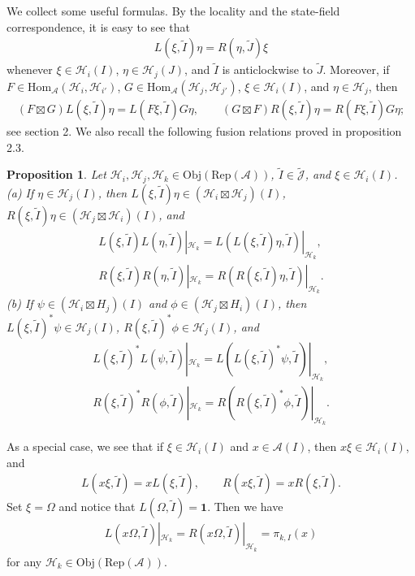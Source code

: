 \documentclass[11pt,b5paper,notitlepage]{article}
\theoremstyle{definition}
\theoremstyle{plain}
\newtheorem{pp}[df]{Proposition}
\newcommand{\mc}{\mathcal}
\newcommand{\wtd}{\widetilde}
\newcommand{\id}{\mathbf{1}}
\newcommand{\Hom}{\mathrm{Hom}}
\newcommand{\Jtd}{\widetilde{\mathcal J}}
\newcommand{\RepA}{\mathrm{Rep}(\mc A)}
\newcommand{\Obj}{\mathrm{Obj}}
\numberwithin{equation}{subsection}
\begin{document}
We collect some useful formulas. By the locality and the state-field correspondence, it is  easy to see that
\begin{align}
L(\xi,\wtd I)\eta=R(\eta,\wtd J)\xi
\end{align}
whenever $\xi\in\mc H_i(I)$, $\eta\in\mc H_j(J)$, and $\wtd I$ is anticlockwise to $\wtd J$. Moreover, if $F\in\Hom_{\mc A}(\mc H_i,\mc H_{i'})$, $G\in\Hom_{\mc A}(\mc H_j,\mc H_{j'})$,  $\xi\in\mc H_i(I)$, and $\eta\in\mc H_j$, then
\begin{align}
(F\boxtimes G)L(\xi,\wtd I)\eta=L(F\xi,\wtd I)G\eta,\qquad (G\boxtimes F)R(\xi,\wtd I)\eta=R(F\xi,\wtd I)G\eta;\label{eq14}
\end{align}
see \cite{Gui21b} section 2. We also recall the following fusion relations proved in \cite{Gui21b} proposition 2.3.
\begin{pp}\label{lb10}
	Let $\mc H_i,\mc H_j,\mc H_k\in\Obj(\RepA)$, $\wtd I\in\Jtd$, and $\xi\in\mc H_i(I)$.\\
	(a) If $\eta\in\mc H_j(I)$, then $L(\xi,\wtd I)\eta\in(\mc H_i\boxtimes\mc H_j)(I)$, $R(\xi,\wtd I)\eta\in(\mc H_j\boxtimes\mc H_i)(I)$, and
	\begin{gather}
	L(\xi,\wtd I)L(\eta,\wtd I)|_{\mc H_k}=L(L(\xi,\wtd I)\eta,\wtd I)|_{\mc H_k},\label{eq9}\\
	R(\xi,\wtd I)R(\eta,\wtd I)|_{\mc H_k}=R(R(\xi,\wtd I)\eta,\wtd I)|_{\mc H_k}.\label{eq10}
	\end{gather}
	(b) If $\psi\in(\mc H_i\boxtimes H_j)(I)$ and $\phi\in (\mc H_j\boxtimes H_i)(I)$, then $L(\xi,\wtd I)^*\psi\in\mc H_j(I)$, $R(\xi,\wtd I)^*\phi\in\mc H_j(I)$, and
	\begin{gather}
	L(\xi,\wtd I)^*L(\psi,\wtd I)|_{\mc H_k}=L(L(\xi,\wtd I)^*\psi,\wtd I)|_{\mc H_k},\label{eq11}\\
	R(\xi,\wtd I)^*R(\phi,\wtd I)|_{\mc H_k}=R(R(\xi,\wtd I)^*\phi,\wtd I)|_{\mc H_k}.\label{eq12}
	\end{gather}
\end{pp}
As a special case, we see that if $\xi\in\mc H_i(I)$ and $x\in\mc A(I)$, then $x\xi\in\mc H_i(I)$, and
\begin{gather}
L(x\xi,\wtd I)=xL(\xi,\wtd I),\qquad R(x\xi,\wtd I)=xR(\xi,\wtd I).\label{eq13}
\end{gather}
Set $\xi=\Omega$ and notice that $L(\Omega,\wtd I)=\id$. Then we have
\begin{align}
L(x\Omega,\wtd I)|_{\mc H_k}= R(x\Omega,\wtd I)|_{\mc H_k}=\pi_{k,I}(x)
\end{align}
for any $\mc H_k\in\Obj(\RepA)$.
\end{document}
